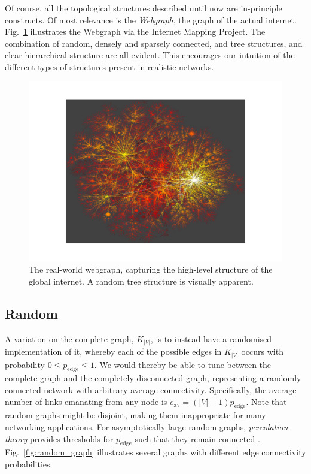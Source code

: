 \documentclass[aps,rmp,twocolumn,amsmath,amssymb,nofootinbib,superscriptaddress]{revtex4}
\newcommand{\comment}[1]{{\color{blue}{\textbf{#1}}}}
\begin{document}
Of course, all the topological structures described until now are in-principle constructs. Of most relevance is the \emph{Webgraph}, the graph of the actual internet. Fig.~\ref{fig:webgraph} illustrates the Webgraph via the Internet Mapping Project. The combination of random, densely and sparsely connected, and tree structures, and clear hierarchical structure are all evident. This encourages our intuition of the different types of structures present in realistic networks.

\begin{figure}[!htb]
\includegraphics[width=\columnwidth]{webgraph}
\caption{The real-world webgraph, capturing the high-level structure of the global internet. A random tree structure is visually apparent. \comment{CITE THE SOURCE! Is it open source?}} \label{fig:webgraph}
\end{figure}

%
%

\subsection{Random}

A variation on the complete graph, $K_{|V|}$, is to instead have a randomised implementation of it, whereby each of the possible edges in $K_{|V|}$ occurs with probability \mbox{$0\leq p_\mathrm{edge}\leq 1$}. We would thereby be able to tune between the complete graph and the completely disconnected graph, representing a randomly connected network with arbitrary average connectivity. Specifically, the average number of links emanating from any node is \mbox{$e_\mathrm{av} = (|V|-1)p_\mathrm{edge}$}. Note that random graphs might be disjoint, making them inappropriate for many networking applications. For asymptotically large random graphs, \emph{percolation theory} \cite{???} provides thresholds for $p_\mathrm{edge}$ such that they remain connected \cite{???}. Fig.~\ref{fig:random_graph} illustrates several graphs with different edge connectivity probabilities.
\end{document}
